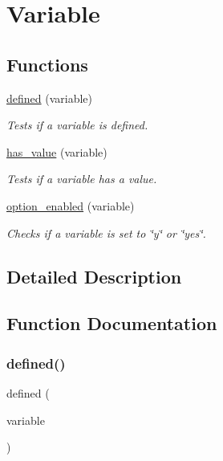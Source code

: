 \hypertarget{group__variable}{}\section{Variable}
\label{group__variable}
\subsection*{Functions}
\begin{DoxyCompactItemize}
\item 
\hyperlink{group__variable_ga956e988b821bf93dde52117a3f881036}{defined} (variable)
\begin{DoxyCompactList}\small\item\em Tests if a variable is defined. \end{DoxyCompactList}\item 
\hyperlink{group__variable_gadcb24eedf60597a74574f69ef6a8de8e}{has\+\_\+value} (variable)
\begin{DoxyCompactList}\small\item\em Tests if a variable has a value. \end{DoxyCompactList}\item 
\hyperlink{group__variable_ga6bdc53eb2a5563fa32ea4b342b665b70}{option\+\_\+enabled} (variable)
\begin{DoxyCompactList}\small\item\em Checks if a variable is set to \char`\"{}y\char`\"{} or \char`\"{}yes\char`\"{}. \end{DoxyCompactList}\end{DoxyCompactItemize}


\subsection{Detailed Description}


\subsection{Function Documentation}
\mbox{\label{group__variable_ga956e988b821bf93dde52117a3f881036}} 
\subsubsection{\texorpdfstring{defined()}{defined()}}
{\footnotesize\ttfamily defined (\begin{DoxyParamCaption}\item[{variable}]{ }\end{DoxyParamCaption})}



